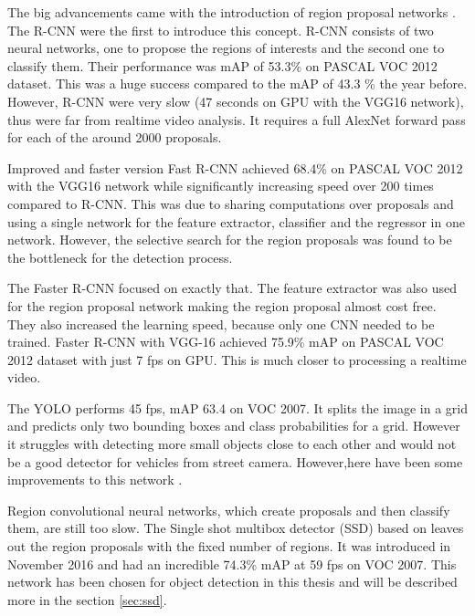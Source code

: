 \documentclass[a4paper,12pt,titlepage, twoside]{article}
\numberwithin{figure}{section}
\begin{document}
The big advancements came with the introduction of region proposal networks \cite{girshick2016region}. The R-CNN \cite{DBLP:journals/corr/GirshickDDM13} were the first to introduce this concept. R-CNN consists of two neural networks, one to propose the regions of interests and the second one to classify them. Their performance was mAP of 53.3\% on PASCAL VOC 2012 dataset. This was a huge success compared to the mAP of 43.3 \%\cite{carreira2012cpmc} the year before. However, R-CNN were very slow (47 seconds on GPU with the VGG16 \cite{simonyan2014very} network), thus were far from realtime video analysis. It requires a full AlexNet forward pass for each of the around 2000 proposals.

Improved and faster version Fast R-CNN \cite{girshick2015fast} achieved 68.4\% on PASCAL VOC 2012 with the VGG16 network while significantly increasing speed over 200 times compared to R-CNN. This was due to sharing computations over proposals and using a single network for the feature extractor, classifier and the regressor in one network. However, the selective search for the region proposals was found to be the bottleneck for the detection process.

The Faster R-CNN focused on exactly that. The feature extractor was also used for the region proposal network making the region proposal almost cost free. They also increased the learning speed, because only one CNN needed to be trained. Faster R-CNN with VGG-16 achieved 75.9\% mAP on PASCAL VOC 2012 dataset with just 7 fps on GPU. This is much closer to processing a realtime video.

The YOLO \cite{redmon2016you} performs 45 fps, mAP 63.4 on VOC 2007. It splits the image in a grid and predicts only two bounding boxes and class probabilities for a grid. However it struggles with detecting more small objects close to each other and would not be a good detector for vehicles from street camera. However,here have been some improvements to this network \cite{redmon2017yolo9000, redmon2018yolov3}.

Region convolutional neural networks, which create proposals and then classify them, are still too slow. The Single shot multibox detector (SSD) \cite{liu2016ssd} based on \cite{erhan2014scalable} leaves out the region proposals with the fixed number of regions. It was introduced in November 2016 and had an incredible 74.3\% mAP at 59 fps on VOC 2007. This network has been chosen for object detection in this thesis and will be described more in the section \ref{sec:ssd}. 
\end{document}
